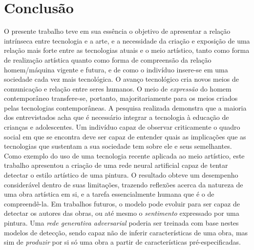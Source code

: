 \documentclass[12pt, a4paper]{article}
\begin{document}
\section{Conclusão}
O presente trabalho teve em sua essência o objetivo de apresentar a relação intrínseca entre tecnologia e a arte, e a necessidade da criação e exposição de uma relação mais forte entre as tecnologias atuais e o meio artístico, tanto como forma de realização artística quanto como forma de compreensão da relação homem/máquina vigente e futura, e de como o indivíduo insere-se em uma sociedade cada vez mais tecnológica. O avanço tecnológico cria novos meios de comunicação e relação entre seres humanos. O meio de \emph{expressão} do homem contemporâneo transfere-se, portanto, majoritariamente para os meios criados pelas tecnologias contemporâneas. A pesquisa realizada demonstra que a maioria dos entrevistados acha que é necessário integrar a tecnologia à educação de crianças e adolescentes. Um indivíduo capaz de observar criticamente o quadro social em que se encontra deve ser capaz de entender quais as implicações que as tecnologias que sustentam a sua sociedade tem sobre ele e seus semelhantes. Como exemplo do uso de uma tecnologia recente aplicada ao meio artístico, este trabalho apresentou a criação de uma rede neural artificial capaz de tentar detectar o estilo artístico de uma pintura. O resultado obteve um desempenho considerável dentro de suas limitações, trazendo reflexões acerca da natureza de uma obra artística em si, e a tarefa essencialmente humana que é o de compreendê-la. Em trabalhos futuros, o modelo pode evoluir para ser capaz de detectar os autores das obras, ou até mesmo o \emph{sentimento} expressado por uma pintura. Uma \emph{rede generativa adversarial} poderia ser treinada com base nestes modelos de detecção, sendo capaz não de inferir características de uma obra, mas sim de \emph{produzir} por si só uma obra a partir de características pré-especificadas. 

\newpage
\printbibliography
\end{document}
